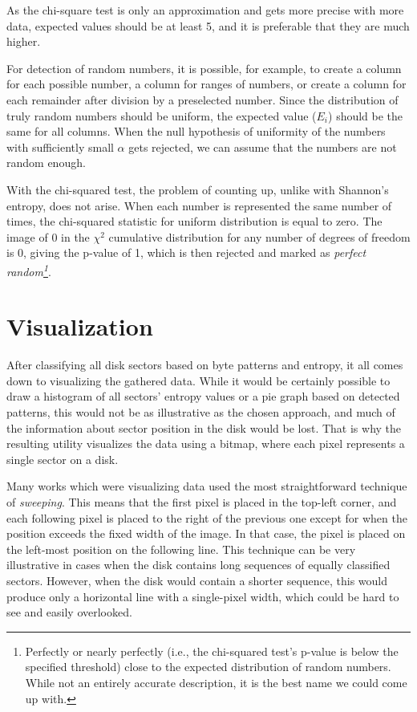 \documentclass[
  digital, %
  color,   %
  oneside, %
  lof,     %
  nolot,     %
]{fithesis4}
\begin{document}
As the chi-square test is only an approximation and gets more precise with more data, expected values should be at least 5, and it is preferable that they are much higher.\cite{knuth81}

For detection of random numbers, it is possible, for example, to create a column for each possible number, a column for ranges of numbers, or create a column for each remainder after division by a preselected number.
Since the distribution of truly random numbers should be uniform, the expected value ($E_i$) should be the same for all columns.
When the null hypothesis of uniformity of the numbers with sufficiently small $\alpha$ gets rejected, we can assume that the numbers are not random enough.

With the chi-squared test, the problem of counting up, unlike with Shannon's entropy, does not arise. When each number is represented the same number of times, the chi-squared statistic for uniform distribution is equal to zero. The image of 0 in the $\chi^2$ cumulative distribution for any number of degrees of freedom is 0, giving the p-value of 1, which is then rejected and marked as \emph{perfect random\footnote{
  Perfectly or nearly perfectly (i.e., the chi-squared test's p-value is below the specified threshold) close to the expected distribution of random numbers.
  While not an entirely accurate description, it is the best name we could come up with.
}}.

\section{Visualization}
\label{sec:visualization}
After classifying all disk sectors based on byte patterns and entropy, it all comes down to visualizing the gathered data.
While it would be certainly possible to draw a histogram of all sectors' entropy values or a pie graph based on detected patterns, this would not be as illustrative as the chosen approach, and much of the information about sector position in the disk would be lost.
That is why the resulting utility visualizes the data using a bitmap, where each pixel represents a single sector on a disk.

Many works which were visualizing data used the most straightforward technique of \emph{sweeping}.\cite{hargreaves13, charalampidis18, broz11}
This means that the first pixel is placed in the top-left corner, and each following pixel is placed to the right of the previous one except for when the position exceeds the fixed width of the image.
In that case, the pixel is placed on the left-most position on the following line.
This technique can be very illustrative in cases when the disk contains long sequences of equally classified sectors.
However, when the disk would contain a shorter sequence, this would produce only a horizontal line with a single-pixel width, which could be hard to see and easily overlooked. 
\end{document}
